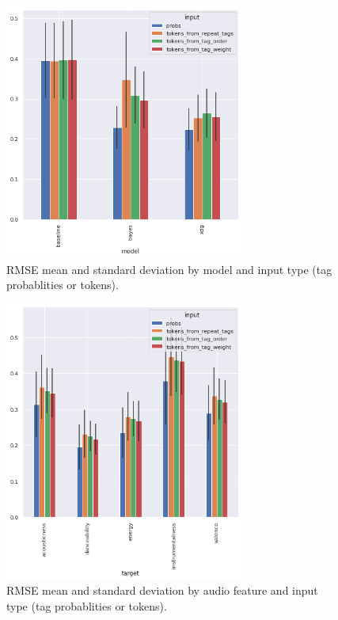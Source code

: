 \documentclass[sn-mathphys]{sn-jnl}%
\theoremstyle{thmstyleone}%
\theoremstyle{thmstyletwo}%
\theoremstyle{thmstylethree}%
\begin{document}
\begin{figure}[h!]
      \centering
      \includegraphics[width=0.7\textwidth]{images/rmse_by_model_and_input.png}
      \caption{RMSE mean and standard deviation by model and input type (tag probablities or tokens).}
      \label{fig:rmse_by_model_and_input}
\end{figure}


\begin{figure}[h!]
      \centering
      \includegraphics[width=0.7\textwidth]{images/rmse_by_feature_and_input.png}
      \caption{RMSE mean and standard deviation by audio feature and input type (tag probablities or tokens).}
      \label{fig:rmse_by_feature_and_input}
\end{figure}
\end{document}
